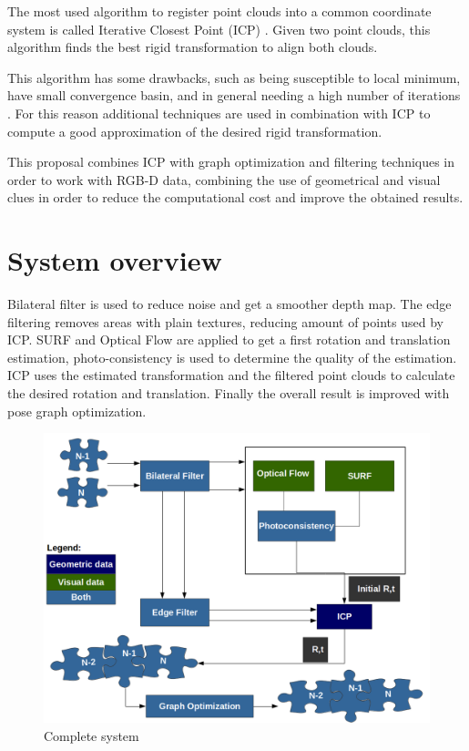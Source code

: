 
The most used algorithm to register point clouds into a common coordinate 
system is called Iterative Closest Point (ICP) \cite{mckay92}. Given two point clouds, 
this algorithm finds the best rigid transformation to align both clouds. 

This algorithm has some drawbacks, such as being susceptible to local minimum, 
have small convergence basin, and in general needing a high number of iterations \cite{Rusu2009}. 
For this reason additional techniques are used in combination with ICP to compute a good approximation 
of the desired rigid transformation.  


This proposal combines ICP with graph optimization and filtering techniques in order to work with RGB-D data, combining the use of geometrical 
and visual clues in order to reduce the computational cost and improve the obtained results.

\section{System overview}


Bilateral filter is used to reduce noise and get a smoother depth map. The edge filtering removes areas with plain textures, 
reducing amount of points used by ICP. SURF and Optical Flow are applied to get a first rotation and translation estimation, 
 photo-consistency is used to determine the quality of the estimation. ICP uses the estimated transformation and the filtered 
point clouds to calculate the desired rotation and translation. Finally the overall result is improved with pose graph optimization.

\begin{figure}[h!]
\begin{center}
\includegraphics[scale=0.45]{images/complete_system}
\caption{Complete system}
\end{center}
\end{figure}

